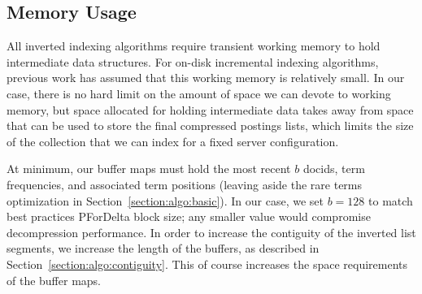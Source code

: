 \subsection{Memory Usage}

All inverted indexing algorithms require transient working memory to hold intermediate data structures. For on-disk incremental indexing algorithms, previous work has assumed that this working memory is relatively small. In our case, there is no hard limit on the amount of space we can devote to working memory, but space allocated for holding intermediate data takes away from space that can be used to store the final compressed postings lists, which limits the size of the collection that we can index for a fixed server configuration.

At minimum, our buffer maps must hold the most recent $b$ docids, term frequencies, and associated term positions (leaving aside the rare terms optimization in Section~\ref{section:algo:basic}). In our case, we set $b=128$ to match best practices PForDelta block size; any smaller value would compromise decompression performance. In order to increase the contiguity of the inverted list segments, we increase the length of the buffers, as described in Section~\ref{section:algo:contiguity}. This of course increases the space requirements of the buffer maps.

